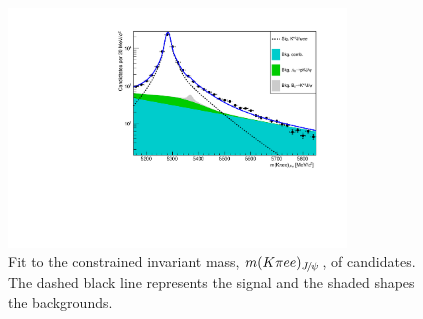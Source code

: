 
\begin{figure}[h!]
\centering
\includegraphics[width=0.8\textwidth]{RKst/figs/Fit/fit_EE/fit_JPs_L_log.pdf}
\caption{Fit to the constrained invariant mass, $\mKpiee_{\jpsi}$, of \mbox{\BdToKstJPsee} candidates.
The dashed black line represents the signal and the shaded shapes the backgrounds.}
\label{fig:fitJPsEE}
\end{figure}


